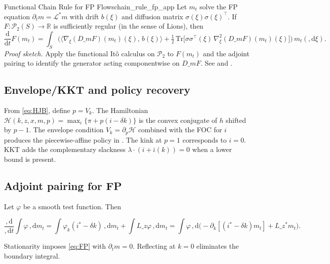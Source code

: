 \documentclass[11pt,letterpaper,oneside]{article}
\numberwithin{equation}{section}
\newcommand{\R}{\mathbb{R}}
\newcommand{\1}{\mathbf{1}}
\newcommand{\diff}{,\mathrm{d}}
\newcommand{\Lz}{L\_z}
\newcommand{\Lzadj}{L\_z^{\!*}}
\newcommand{\Dm}{D\_m}
\newcommand{\kbar}{\bar\iota}
\begin{document}
\begin{lemma}{Functional Chain Rule for FP Flows}{chain_rule_fp_app}
Let $m_t$ solve the FP equation $\partial_t m = \mathcal L^{\!*} m$ with drift $b(\xi)$ and diffusion matrix $\sigma(\xi)\sigma(\xi)^\top$. If $F:\mathcal P_2(S)\to\R$ is sufficiently regular (in the sense of Lions), then
\[
\frac{\mathrm d}{\mathrm dt} F(m_t) 
= \int_S \Big( \langle \nabla_\xi (\Dm F)(m_t)(\xi),\, b(\xi) \rangle 
  + \tfrac12 \, \mathrm{Tr}\big[\sigma\sigma^\top(\xi)\, \nabla^2_\xi (\Dm F)(m_t)(\xi)\big] \Big) \, m_t(\diff \xi).
\]
\emph{Proof sketch.} Apply the functional It\^o calculus on $\mathcal P_2$ to $F(m_t)$ and the adjoint pairing to identify the generator acting componentwise on $\Dm F$. See \cite[Ch.~5]{carmona_delarue_2018_mfg} and \cite{cardaliaguet_delarue_lasry_lions_2019}.
\end{lemma}

\subsection{Envelope/KKT and policy recovery}
From \eqref{eq:HJB}, define $p=V_k$. The Hamiltonian
$\mathcal{H}(k,z,x,m,p)=\max_i\{\pi+p(i-\delta k)\}$
is the convex conjugate of $h$ shifted by $p-1$. The envelope condition $V_k=\partial_p \mathcal{H}$ combined with the FOC for $i$ produces the piecewise-affine policy in . The kink at $p=1$ corresponds to $i=0$. KKT adds the complementary slackness $\lambda\cdot(i+\kbar(k))=0$ when a lower bound is present.

\subsection{Adjoint pairing for FP}
Let $\varphi$ be a smooth test function. Then

$$
\frac{\diff}{\diff t}\int \varphi\,\diff m_t
= \int \varphi_k (i^*-\delta k)\,\diff m_t + \int \Lz \varphi\,\diff m_t
= \int \varphi\,\diff\Big(-\partial_k[(i^*-\delta k)m_t]+\Lzadj m_t\Big).
$$

Stationarity imposes \eqref{eq:FP} with $\partial_t m=0$. Reflecting at $k=0$ eliminates the boundary integral.
\end{document}
